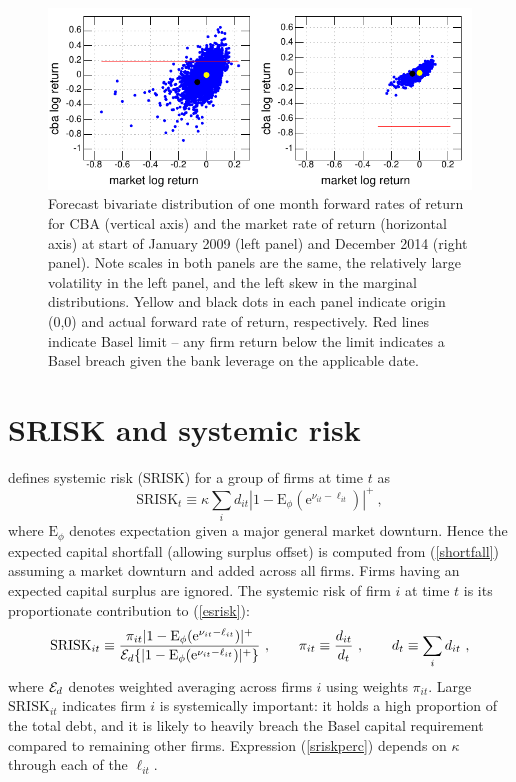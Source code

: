 \documentclass[12pt]{article}
\newcommand{\E}{\mathrm{E}}
\newcommand{\e}{\mathrm{e}}
\newcommand{\Ex}{{\cal E}}
\newcommand{\Es}{\E_\phi}
\newcommand{\eref}[1]{(\ref{#1})}
\newcommand{\cq}{\ , \qquad}
\newcommand{\be}[1]{\begin{equation}\label{#1}}
\newcommand{\ee}{\end{equation}}
\begin{document}
\begin{figure}[htbp]
\begin{center}
\includegraphics{figures/simulation.pdf}
\caption{Forecast bivariate distribution of one month forward rates of return   for CBA (vertical axis) and the market rate of return (horizontal axis) at start of January 2009 (left panel)  and December 2014 (right panel). Note scales in both panels are the same, the relatively large volatility in the left panel, and the left skew in the  marginal distributions.  Yellow and black dots in each panel indicate origin (0,0) and  actual forward  rate of return, respectively.   Red lines indicate Basel limit -- any firm return below the limit indicates a Basel breach given the bank leverage on the applicable date.}
\label{simulation}
\end{center}
\end{figure}

\section{SRISK and systemic risk}\label{srisk}

 \cite{brownlees2015} defines  systemic risk (SRISK) for a group of firms  at time $t$ as
\be{esrisk}
\mathrm{SRISK}_t\equiv\kappa\sum_i d_{it}\left|1-\Es(\e^{\nu_{it}-\ell_{it}})\right|^+ \ ,
\ee
where  $\Es$ denotes expectation given a major general market downturn. Hence the expected capital shortfall (allowing surplus offset) is computed from \eref{shortfall} assuming a market downturn and added across all firms. Firms having an expected capital surplus are ignored. The systemic risk of firm $i$ at time $t$ is its proportionate contribution to \eref{esrisk}:
 \be{sriskperc}
 \mathrm{SRISK}_{it}\equiv \frac{\pi_{it}|1-\Es(\e^{\nu_{it}-\ell_{it}})|^+}{\Ex_d\{|1-\Es(\e^{\nu_{it}-\ell_{it}})|^+\}}\cq \pi_{it}\equiv \frac{d_{it}}{d_t}\cq d_t\equiv \sum_i d_{it}\ ,
 \ee
where $\Ex_d$ denotes weighted averaging across firms $i$ using weights $\pi_{it}$.     Large $\mathrm{SRISK}_{it}$ indicates firm $i$ is systemically important: it holds a high proportion of the total debt, and it is likely to heavily breach the Basel capital requirement compared to remaining other firms.  Expression \eref{sriskperc} depends on $\kappa$ through each of the $\ell_{it}$.
\end{document}
